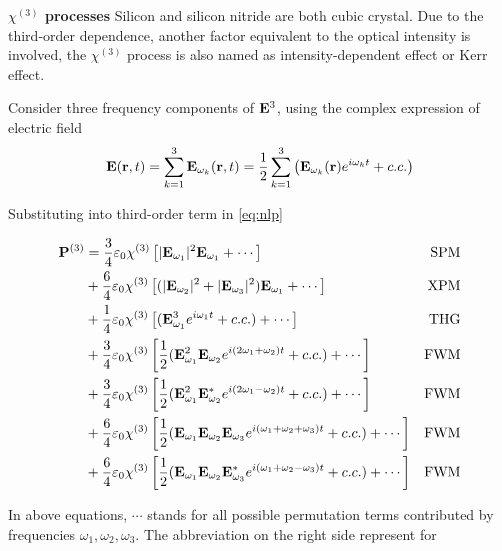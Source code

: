 \documentclass[final]{kuee_en}
\begin{document}
\textbf{$\chi^{(3)}$ processes} Silicon and silicon nitride are both cubic crystal. Due to the third-order dependence, another factor equivalent to the optical intensity is involved, the $\chi^{(3)}$ process is also named as intensity-dependent effect or Kerr effect.

Consider three frequency components of $\vb{E}^3$, using the complex expression of electric field
\begin{equation}
    \vb{E}(\vb{r}, t) = \sum_{k=1}^3 \vb{E}_{\omega_k}(\vb{r}, t) =  \frac{1}{2} \sum_{k=1}^3 \qty ( \vb{E}_{\omega_k}(\vb{r})e^{i\omega_k t} + c.c.)
\end{equation}

Substituting into third-order term in \autoref{eq:nlp}

\begin{align}
  \vb{P}^{(3)} 
  & = \frac{3}{4} \varepsilon_0 \chi^{(3)} \left[| \vb{E}_{\omega_1} |^2 \vb{E}_{\omega_1} + \cdots\right] & \mathrm{SPM} \\
  & + \frac{6}{4} \varepsilon_0 \chi^{(3)} \left[(| \vb{E}_{\omega_2} |^2 + |\vb{E}_{\omega_3} |^2) \vb{E}_{\omega_1} + \cdots \right] & \mathrm{XPM} \\
  & + \frac{1}{4} \varepsilon_0 \chi^{(3)} \left[(\vb{E}_{\omega_1}^3 e^{i \omega_1 t} + c.c.) + \cdots\right] & \mathrm{THG} \\
  & + \frac{3}{4} \varepsilon_0 \chi^{(3)} \left[ \frac{1}{2} (\vb{E}_{\omega_1}^2 \vb{E}_{\omega_2} e^{i (2 \omega_1 + \omega_2) t} + c.c.) + \cdots \right] & \mathrm{FWM} \label{eq:fwm1} \\ 
  & + \frac{3}{4} \varepsilon_0 \chi^{(3)} \left[ \frac{1}{2} (\vb{E}_{\omega_1}^2 \vb{E}^{\ast}_{\omega_2} e^{i (2 \omega_1 - \omega_2) t} + c.c.) + \cdots \right] & \mathrm{FWM} \label{eq:fwm2} \\ 
  & + \frac{6}{4} \varepsilon_0 \chi^{(3)} \left[ \frac{1}{2} (\vb{E}_{\omega_1} \vb{E}_{\omega_2} \vb{E}_{\omega_3} e^{i (\omega_1 + \omega_2 + \omega_3) t} + c.c.) + \cdots \right] & \mathrm{FWM}  \label{eq:fwm3} \\
  & + \frac{6}{4} \varepsilon_0 \chi^{(3)} \left[ \frac{1}{2} (\vb{E}_{\omega_1} \vb{E}_{\omega_2} \vb{E}^{\ast}_{\omega_3} e^{i (\omega_1 + \omega_2 - \omega_3) t} + c.c.) + \cdots \right] & \mathrm{FWM} \label{eq:fwm4}
\end{align}

In above equations, $\cdots$ stands for all possible permutation terms contributed by frequencies $\omega_1, \omega_2, \omega_3$. The abbreviation on the right side represent for 
\end{document}
